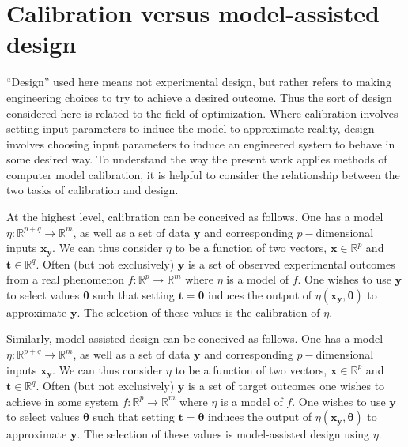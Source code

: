 \documentclass[12pt]{article}
\begin{document}

\section{Calibration versus model-assisted design}

``Design'' used here means not experimental design, but rather refers to making engineering choices to try to achieve a desired outcome.
Thus the sort of design considered here is related to the field of optimization.
Where calibration involves setting input parameters to induce the model to approximate reality, design involves choosing input parameters to induce an engineered system to behave in some desired way.
To understand the way the present work applies methods of computer model calibration, it is helpful to consider the relationship between the two tasks of calibration and design.

At the highest level, calibration can be conceived as follows.
One has a model $\eta: \mathbb{R}^{p+q} \to \mathbb{R}^m$, as well as a set of data $\mathbf{y}$ and corresponding $p-$dimensional inputs $\mathbf{x_y}$.
We can thus consider $\eta$ to be a function of two vectors, $\mathbf x\in\mathbb R^p$ and $\mathbf t\in\mathbb R^q$.
Often (but not exclusively) $\mathbf y$ is a set of observed experimental outcomes from a real phenomenon $f:\mathbb{R}^p\to\mathbb{R}^m$ where $\eta$ is a model of $f$.
One wishes to use $\mathbf y$ to select values $\boldsymbol{\theta}$ such that setting $\mathbf t=\boldsymbol{\theta}$ induces the output of $\eta(\mathbf {x_y},\boldsymbol{\theta})$ to approximate $\mathbf y$.
The selection of these values is the calibration of $\eta$.

Similarly, model-assisted design can be conceived as follows.
One has a model $\eta: \mathbb{R}^{p+q} \to \mathbb{R}^m$, as well as a set of data $\mathbf{y}$ and corresponding $p-$dimensional inputs $\mathbf{x_y}$.
We can thus consider $\eta$ to be a function of two vectors, $\mathbf x\in\mathbb R^p$ and $\mathbf t\in\mathbb R^q$.
Often (but not exclusively) $\mathbf y$ is a set of target outcomes one wishes to achieve in some system $f:\mathbb{R}^p\to\mathbb{R}^m$ where $\eta$ is a model of $f$.
One wishes to use $\mathbf y$ to select values $\boldsymbol{\theta}$ such that setting $\mathbf t=\boldsymbol{\theta}$ induces the output of $\eta(\mathbf {x_y},\boldsymbol{\theta})$ to approximate $\mathbf y$.
The selection of these values is model-assisted design using $\eta$.
\end{document}
